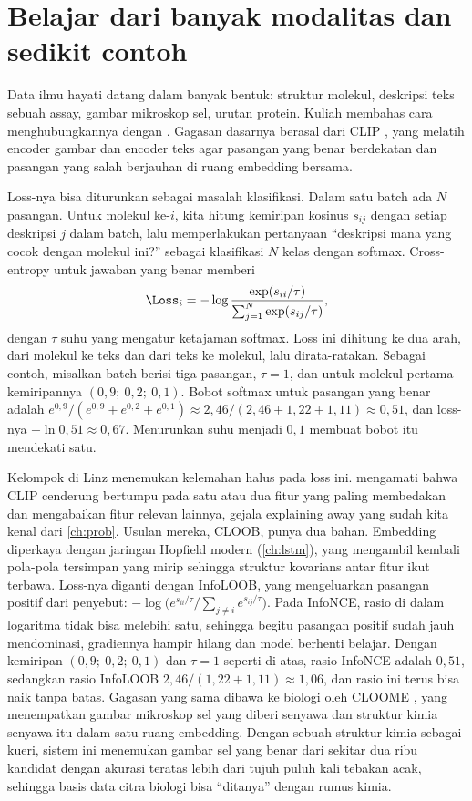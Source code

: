 \section{Belajar dari banyak modalitas dan sedikit contoh}

Data ilmu hayati datang dalam banyak bentuk: struktur molekul, deskripsi teks sebuah assay, gambar mikroskop sel, urutan
protein. Kuliah membahas cara menghubungkannya dengan . Gagasan dasarnya berasal dari CLIP
\citep{radford2021}, yang melatih encoder gambar dan encoder teks agar pasangan yang benar berdekatan dan pasangan yang
salah berjauhan di ruang embedding bersama.

Loss-nya bisa diturunkan sebagai masalah klasifikasi. Dalam satu batch ada $N$ pasangan. Untuk molekul ke-$i$, kita hitung
kemiripan kosinus $s_{ij}$ dengan setiap deskripsi $j$ dalam batch, lalu memperlakukan pertanyaan ``deskripsi mana yang
cocok dengan molekul ini?'' sebagai klasifikasi $N$ kelas dengan softmax. Cross-entropy untuk jawaban yang benar memberi
\begin{equation}
\Loss_i=-\log\frac{\exp(s_{ii}/\tau)}{\sum_{j=1}^N\exp(s_{ij}/\tau)},
\end{equation}
dengan $\tau$ suhu yang mengatur ketajaman softmax. Loss ini dihitung ke dua arah, dari molekul ke teks dan dari teks ke
molekul, lalu dirata-ratakan. Sebagai contoh, misalkan batch berisi tiga pasangan, $\tau=1$, dan untuk molekul pertama
kemiripannya $(0{,}9;\ 0{,}2;\ 0{,}1)$. Bobot softmax untuk pasangan yang benar adalah
$e^{0{,}9}/(e^{0{,}9}+e^{0{,}2}+e^{0{,}1})\approx2{,}46/(2{,}46+1{,}22+1{,}11)\approx0{,}51$, dan loss-nya
$-\ln0{,}51\approx0{,}67$. Menurunkan suhu menjadi $0{,}1$ membuat bobot itu mendekati satu.

Kelompok di Linz menemukan kelemahan halus pada loss ini. \citet{furst2022} mengamati bahwa CLIP cenderung bertumpu pada satu atau
dua fitur yang paling membedakan dan mengabaikan fitur relevan lainnya, gejala explaining away yang sudah kita kenal dari
\cref{ch:prob}. Usulan mereka, CLOOB, punya dua bahan. Embedding diperkaya dengan jaringan Hopfield modern (\cref{ch:lstm}), yang
mengambil kembali pola-pola tersimpan yang mirip sehingga struktur kovarians antar fitur ikut terbawa. Loss-nya diganti dengan
InfoLOOB, yang mengeluarkan pasangan positif dari penyebut:
$-\log\big(e^{s_{ii}/\tau}/\sum_{j\ne i}e^{s_{ij}/\tau}\big)$. Pada InfoNCE, rasio di dalam logaritma tidak bisa melebihi satu, sehingga
begitu pasangan positif sudah jauh mendominasi, gradiennya hampir hilang dan model berhenti belajar. Dengan kemiripan
$(0{,}9;\ 0{,}2;\ 0{,}1)$ dan $\tau=1$ seperti di atas, rasio InfoNCE adalah $0{,}51$, sedangkan rasio InfoLOOB
$2{,}46/(1{,}22+1{,}11)\approx1{,}06$, dan rasio ini terus bisa naik tanpa batas. Gagasan yang sama dibawa ke biologi oleh CLOOME
\citep{sanchez2023}, yang menempatkan gambar mikroskop sel yang diberi senyawa dan struktur kimia senyawa itu dalam satu ruang
embedding. Dengan sebuah struktur kimia sebagai kueri, sistem ini menemukan gambar sel yang benar dari sekitar dua ribu kandidat
dengan akurasi teratas lebih dari tujuh puluh kali tebakan acak, sehingga basis data citra biologi bisa ``ditanya'' dengan rumus
kimia.

